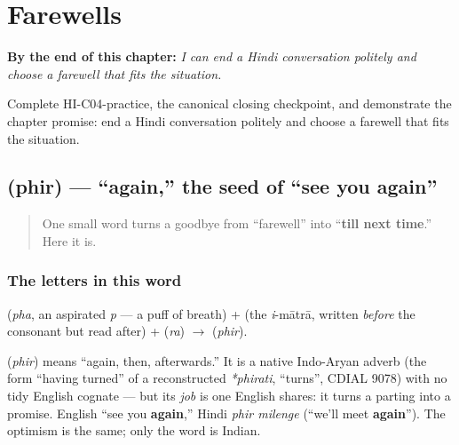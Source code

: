 
\chapter{Farewells}
\label{ch:farewells}

\begin{chapteropening}
\textbf{By the end of this chapter:} \emph{I can end a Hindi conversation politely and choose a farewell that fits the situation.}

Complete HI-C04-practice, the canonical closing checkpoint, and demonstrate the chapter promise: end a Hindi conversation politely and choose a farewell that fits the situation.
\end{chapteropening}

\section[\texorpdfstring{\hi{फिर} (phir)}{फिर (phir)}]{ (phir) — \textquotedblleft{}again,\textquotedblright{} the seed of \textquotedblleft{}see you again\textquotedblright{}}

\label{lesson:HI-C04-phir}



\begin{quote}
One small word turns a goodbye from \textquotedblleft{}farewell\textquotedblright{} into \textquotedblleft{}\textbf{till next time}.\textquotedblright{} Here it is.
\end{quote}

\subsection*{The letters in this word}
\textbf{} (\emph{pha}, an aspirated \emph{p} — a puff of breath) + \textbf{} (the \emph{i}-mātrā, written \emph{before} the consonant but read after) + \textbf{} (\emph{ra}) $\to$ \textbf{} (\emph{phir}).

\begin{cousinweb}
\textbf{} (\emph{phir}) means \textquotedblleft{}again, then, afterwards.\textquotedblright{} It is a native Indo-Aryan adverb (the form \textquotedblleft{}having turned\textquotedblright{} of a reconstructed \emph{*phirati}, \textquotedblleft{}turns\textquotedblright{}, CDIAL 9078) with no tidy English cognate — but its \emph{job} is one English shares: it turns a parting into a promise. English \textquotedblleft{}see you \textbf{again},\textquotedblright{} Hindi \emph{phir milenge} (\textquotedblleft{}we'll meet \textbf{again}\textquotedblright{}). The optimism is the same; only the word is Indian.
\end{cousinweb}

